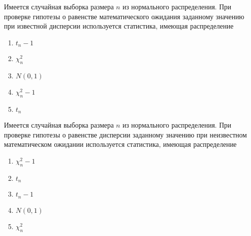 \documentclass[t]{beamer}
\begin{document}
 \begin{frame} \label{41} 
\begin{block}{41} 

Имеется случайная выборка размера $n$ из нормального распределения. При проверке гипотезы о равенстве математического ожидания заданному значению при известной дисперсии используется статистика, имеющая распределение
 


 \end{block} 
\begin{enumerate} 
\item[] \hyperlink{41-No}{\beamergotobutton{}  $t_n-1$}
\item[] \hyperlink{41-No}{\beamergotobutton{} $\chi^2_n$}
\item[] \hyperlink{41-Yes}{\beamergotobutton{} $N(0,1)$}
\item[] \hyperlink{41-No}{\beamergotobutton{} $\chi^2_n-1$}
\item[] \hyperlink{41-No}{\beamergotobutton{} $t_n$}
\end{enumerate} 
\end{frame} 


 \begin{frame} \label{42} 
\begin{block}{42} 

Имеется случайная выборка размера $n$ из нормального распределения. При проверке гипотезы о равенстве дисперсии заданному значению при неизвестном математическом ожидании используется статистика, имеющая распределение
 


 \end{block} 
\begin{enumerate} 
\item[] \hyperlink{42-Yes}{\beamergotobutton{} $\chi^2_n-1$}
\item[] \hyperlink{42-No}{\beamergotobutton{} $t_n$}
\item[] \hyperlink{42-No}{\beamergotobutton{}  $t_n-1$}
\item[] \hyperlink{42-No}{\beamergotobutton{} $N(0,1)$}
\item[] \hyperlink{42-No}{\beamergotobutton{} $\chi^2_n$}
\end{enumerate} 
\end{frame} 
\end{document}
